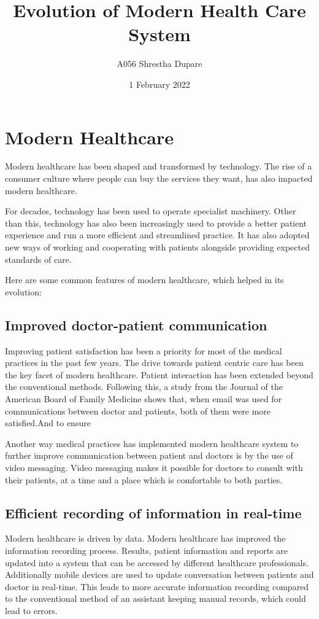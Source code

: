 \documentclass[10pt]{article}
\title{Evolution of Modern Health Care System}
\author{A056 Shrestha Dupare}
\date{1 February 2022}
\begin{document}
\maketitle

\section{Modern Healthcare}

Modern healthcare has been shaped and transformed by technology. The rise of a consumer culture where people can buy the services they want, has also impacted modern healthcare.


For decades, technology has been used to operate specialist machinery. Other than this, technology has also been increasingly used to provide a better patient experience and run a more efficient and streamlined practice. It has also adopted new ways of working and cooperating with patients alongside providing expected standards of care.


Here are some common features of modern healthcare, which helped in its evolution:

\subsection{Improved doctor-patient communication}

Improving patient satisfaction has been a priority for most of the medical practices in the past few years. The drive towards patient centric care has been the key facet of modern healthcare. Patient interaction has been extended beyond the conventional methods. Following this, a study from the Journal of the American Board of Family Medicine shows that, when email was used for communications between doctor and patients, both of them were more satisfied.And to ensure 


Another way medical practices has implemented modern healthcare system to further improve communication between patient and doctors is by the use of video messaging. Video messaging makes it possible for doctors to consult with their patients, at a time and a place which is comfortable to both parties.


\subsection{Efficient recording of information in real-time}

Modern healthcare is driven by data. Modern healthcare has improved the information recording process. Results, patient information and reports are updated into a system that can be accessed by different healthcare professionals. Additionally mobile devices are used to update conversation between patients and doctor in real-time. This leads to more accurate information recording compared to the conventional method of an assistant keeping manual records, which could lead to errors.
\end{document}
